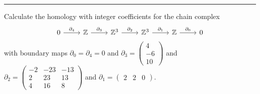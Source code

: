 \documentclass[a4paper, 11pt]{article}
\begin{document}
\noindent\rule{7in}{2.8pt}
\begin{problem}{6}
Calculate the homology with integer coefficients for the chain complex 
$$\begin{tikzcd}
	0 & {\mathbb{Z}} & {\mathbb{Z}^3} & {\mathbb{Z}^3} & {\mathbb{Z}} & 0
	\arrow["{\partial_4}", from=1-1, to=1-2]
	\arrow["{\partial_3}", from=1-2, to=1-3]
	\arrow["{\partial_2}", from=1-3, to=1-4]
	\arrow["{\partial_1}", from=1-4, to=1-5]
	\arrow["{\partial_0}", from=1-5, to=1-6]
\end{tikzcd}$$
with boundary maps \(\partial_0=\partial_4=0\) and \(\partial_3=\begin{pmatrix}
    4\\ 
    -6\\ 
    10
\end{pmatrix}\) and \(\partial_2=\begin{pmatrix}
    -2 & -23 & -13\\ 
    2  & 23 & 13\\ 
    4 & 16 & 8
\end{pmatrix}\) and \(\partial_1=\begin{pmatrix}
    2 & 2& 0
\end{pmatrix}\).
\end{problem}
\end{document}

